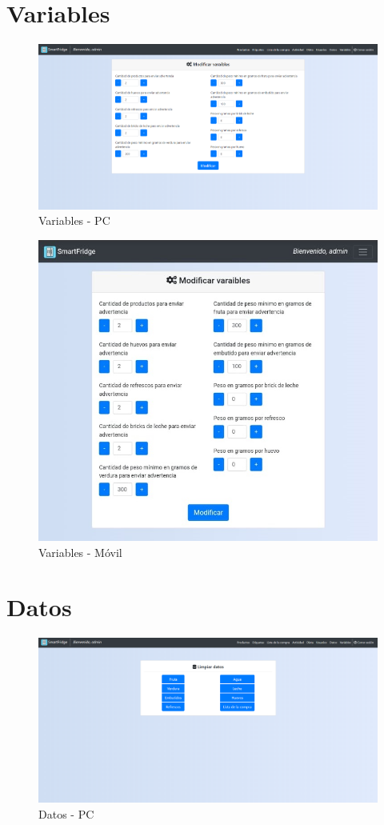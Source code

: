 \section{Variables}
\begin{figure}[h] 
    \centering
    \includegraphics[width=.90\textwidth]{capitulos/anexotres/PC/Variable.png}
    \caption{Variables - PC}
    \label{fig:varaiblepc}
\end{figure}

\begin{figure}[h] 
    \centering
    \includegraphics[width=.50\textwidth]{capitulos/anexotres/Phone/Variable.jpeg}
    \caption{Variables - Móvil}
    \label{fig:variablephone}
\end{figure}

\newpage
\section{Datos}
\begin{figure}[h] 
    \centering
    \includegraphics[width=.90\textwidth]{capitulos/anexotres/PC/Database.png}
    \caption{Datos - PC}
    \label{fig:databasepc}
\end{figure}

